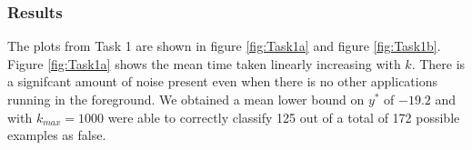 \documentclass[11pt]{article}
\begin{document}
\subsubsection{Results}
The plots from Task 1 are shown in figure \ref{fig:Task1a} and figure \ref{fig:Task1b}. 
Figure \ref{fig:Task1a} shows the mean time taken linearly increasing with $k$. 
There is a signifcant amount of noise present even when there is no other applications running in the foreground.
We obtained a mean lower bound on $y^*$ of $-19.2$ and with $k_{max}=1000$ were able to correctly classify 125 out of a total of 172 possible examples as false.
\end{document}
